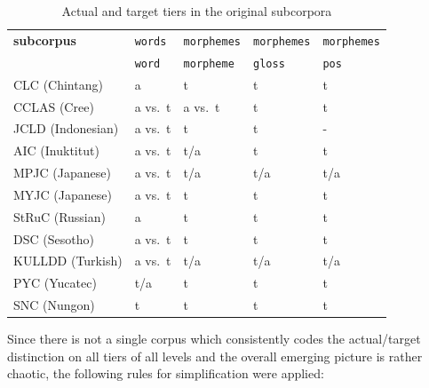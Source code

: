 \documentclass[a4paper, 11pt]{book}
\begin{document}
\begin{table}[ht!]
	\centering
	\begin{tabular}{lllll}
		\toprule
			\textbf{subcorpus} & \texttt{words} & \texttt{morphemes} 	& \texttt{morphemes} & \texttt{morphemes} \\
							   & \texttt{word}  & \texttt{morpheme} 	& \texttt{gloss} 	 & \texttt{pos} \\
		\midrule
			CLC	(Chintang) 		   & a			  	 & t					& t			 		& t     \\
			CCLAS (Cree)		   & a vs.\ t		 & a vs.\ t				& t			 		& t	  	\\
			JCLD (Indonesian)	 	   & a vs.\ t		 & t					& t			 		& - 	\\
			AIC	(Inuktitut)		   & a vs.\ t		 & t/a					& t			 		& t  	\\
			MPJC (Japanese)		   & a vs.\ t		 & t/a					& t/a			 	& t/a 	\\
			MYJC (Japanese)		   & a vs.\ t 	  	 & t		 			& t			 		& t	  	\\
			StRuC (Russian)		   & a			  	 & t					& t			 		& t	  	\\
			DSC	(Sesotho)		   & a vs.\ t		 & t	 				& t			 		& t 	\\
			KULLDD (Turkish)	   & a vs.\ t 	  	 & t/a					& t/a		 		& t/a	\\
			PYC	(Yucatec)		   & t/a			 & t					& t			 		& t	  	\\
			SNC	(Nungon)		   & t			  	 & t					& t			 		& t	  	\\
		\bottomrule
	\end{tabular}
	\caption{Actual and target tiers in the original subcorpora}
	\label{tab:Actual and target tiers in the original subcorpora}
\end{table}

Since there is not a single corpus which consistently codes the actual/target distinction on all tiers of all levels and the overall emerging picture is rather chaotic, the following rules for simplification were applied: 
\end{document}
